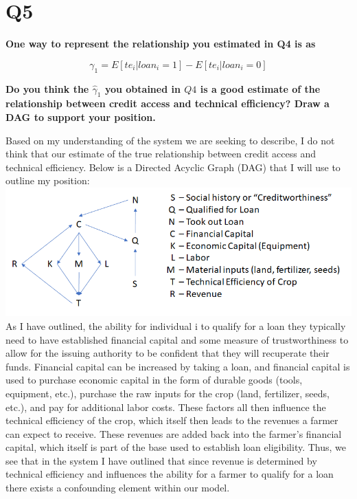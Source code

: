 \documentclass[
]{article}
\begin{document}
\hfill\break

\hfill\break

\hfill\break

\hypertarget{q5}{%
\section{Q5}\label{q5}}

\textbf{One way to represent the relationship you estimated in Q4 is as}

\[\gamma_1 = E[te_i|loan_i = 1] - E[te_i|loan_i =0]\]

\textbf{Do you think the \(\hat{\gamma}_1\) you obtained in \(Q4\) is a
good estimate of the relationship between credit access and technical
efficiency? Draw a DAG to support your position.}

\hfill\break
Based on my understanding of the system we are seeking to describe, I do
not think that our estimate of the true relationship between credit
access and technical efficiency. Below is a Directed Acyclic Graph (DAG)
that I will use to outline my position:\\

\includegraphics{tables and figures/DAG.png}\\
As I have outlined, the ability for individual i to qualify for a loan
they typically need to have established financial capital and some
measure of trustworthiness to allow for the issuing authority to be
confident that they will recuperate their funds. Financial capital can
be increased by taking a loan, and financial capital is used to purchase
economic capital in the form of durable goods (tools, equipment, etc.),
purchase the raw inputs for the crop (land, fertilizer, seeds, etc.),
and pay for additional labor costs. These factors all then influence the
technical efficiency of the crop, which itself then leads to the
revenues a farmer can expect to receive. These revenues are added back
into the farmer's financial capital, which itself is part of the base
used to establish loan eligibility. Thus, we see that in the system I
have outlined that since revenue is determined by technical efficiency
and influences the ability for a farmer to qualify for a loan there
exists a confounding element within our model.
\end{document}
